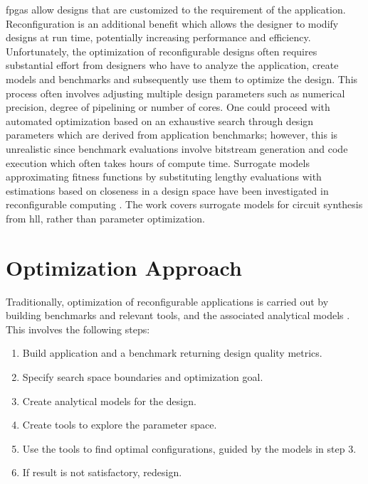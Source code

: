 \documentclass[10pt,conference,a4paper]{IEEEtran}
\begin{document}
\acp{fpga} allow designs that are customized to the requirement of the application. Reconfiguration is an additional benefit which allows the designer to modify designs at run time, potentially increasing performance and efficiency. Unfortunately, the optimization of reconfigurable designs often requires substantial effort from designers who have to analyze the application, create models and benchmarks and subsequently use them to optimize the design. This process often involves adjusting multiple design parameters such as numerical precision, degree of pipelining or number of cores. One could proceed with automated optimization based on an exhaustive search through design parameters which are derived from application benchmarks; however, this is unrealistic since benchmark evaluations involve bitstream generation and code execution which often takes hours of compute time. Surrogate models approximating fitness functions by substituting lengthy evaluations with estimations based on closeness in a design space have been investigated in reconfigurable computing \cite{Pilato2008}. The work covers surrogate models for circuit synthesis from \ac{hll}, rather than parameter optimization.


\section{Optimization Approach} 
\label{design}

Traditionally, optimization of reconfigurable applications is carried out by building benchmarks and relevant tools, and the associated analytical models \cite{Anson2012Quad,Becker:2009:PDR:1530588.1530595}. This involves the following steps:


\begin{enumerate}\addtolength{\itemsep}{-0.1\baselineskip}  
\item Build application and a benchmark returning design quality metrics.
\item Specify search space boundaries and optimization goal.
\item Create analytical models for the design.
\item Create tools to explore the parameter space.
\item Use the tools to find optimal configurations, guided by the models in step 3.
\item If result is not satisfactory, redesign.
\end{enumerate}
\end{document}
